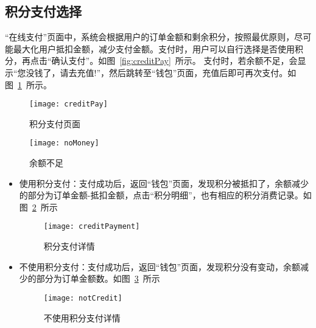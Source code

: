 \subsection{积分支付选择}
“在线支付”页面中，系统会根据用户的订单金额和剩余积分，按照最优原则，尽可能最大化用户抵扣金额，减少支付金额。支付时，用户可以自行选择是否使用积分，再点击“确认支付”。如图~\ref{fig:creditPay}~所示。
支付时，若余额不足，会显示“您没钱了，请去充值!”，然后跳转至“钱包”页面，充值后即可再次支付。如图~\ref{fig:noMoney}~所示。~\\
\begin{figure}[htbp]
    \centering
    \begin{minipage}{0.4\textwidth}
        \centering
        \texttt{[image: creditPay]}
        \caption{积分支付页面}\label{fig:creditPay}
    \end{minipage}
    \begin{minipage}{0.4\textwidth}
        \centering
        \texttt{[image: noMoney]}
        \caption{余额不足}\label{fig:noMoney}
    \end{minipage}
    \vspace{\baselineskip}
\end{figure}
\begin{itemize}
    \item {使用积分支付}：支付成功后，返回“钱包”页面，发现积分被抵扣了，余额减少的部分为订单金额-抵扣金额，点击“积分明细”，也有相应的积分消费记录。如图~\ref{fig:creditPayment}~所示~\\
    \begin{figure}[htbp]
        \centering
        \texttt{[image: creditPayment]}
        \caption{积分支付详情}\label{fig:creditPayment}
        \vspace{\baselineskip}
    \end{figure}

    \item {不使用积分支付}：支付成功后，返回“钱包”页面，发现积分没有变动，余额减少的部分为订单金额数。如图~\ref{fig:notCredit}~所示~\\
    \begin{figure}[htbp]
        \centering
        \texttt{[image: notCredit]}
        \caption{不使用积分支付详情}\label{fig:notCredit}
        \vspace{\baselineskip}
    \end{figure}
\end{itemize}
